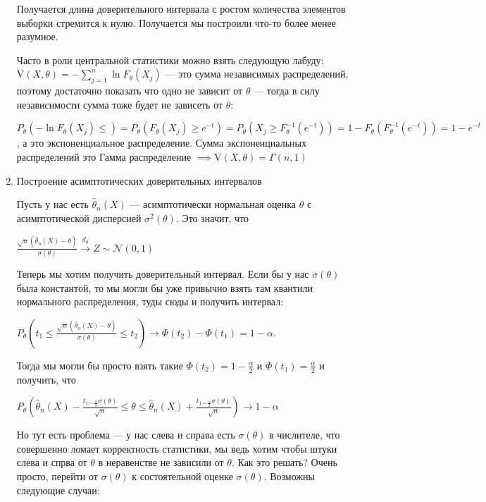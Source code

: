 \begin{enumerate}
\begin{example}
        Получается длина доверительного интервала с ростом количества элементов выборки стремится к нулю.
        Получается мы построили что-то более менее разумное.

        Часто в роли центральной статистики можно взять следующую лабуду: 
        $\text{V}(X, \theta) = -\sum_{j = 1}^n \ln F_\theta(X_j)$ --- это сумма независимых распределений,
        поэтому достаточно показать что одно не зависит от $\theta$ --- тогда в силу независимости сумма тоже
        будет не зависеть от $\theta$:

        $P_\theta(-\ln F_\theta(X_j) \leq) = P_\theta(F_\theta(X_j) \geq e^{-t}) =
        P_\theta(X_j \geq F_\theta^{-1}(e^{-t})) = 1 - F_\theta(F_\theta^{-1}(e^{-t})) = 1 - e^{-t}$, а это
        экспоненциальное распределение. Сумма экспоненциальных распределений это Гамма распределение
        $\implies \text{V}(X, \theta) = \Gamma(n, 1)$
    \end{example}

    \item Построение асимптотических доверительных интервалов
    
    Пусть у нас есть $\hat{\theta}_n(X)$ --- асимптотически нормальная оценка $\theta$ с
    асимптотической дисперсией $\sigma^2(\theta)$. Это значит, что

    $\frac{\sqrt{n}(\hat{\theta}_n(X) - \theta)}{\sigma(\theta)} \xrightarrow{d_\theta} Z \sim \mathcal{N}(0, 1)$

    Теперь мы хотим получить доверительный интервал. Если бы у нас $\sigma(\theta)$ была константой,
    то мы могли бы уже привычно взять там квантили нормального распределения, туды сюды и получить
    интервал: 
    
    $P_\theta(t_1 \leq \frac{\sqrt{n}(\hat{\theta}_n(X) - \theta)}{\sigma(\theta)} \leq t_2)
    \to \Phi(t_2) - \Phi(t_1) = 1 - \alpha$. 
    
    Тогда мы могли бы просто взять такие $\Phi(t_2) = 1 - \frac{\alpha}{2}$
    и $\Phi(t_1) = \frac{\alpha}{2}$ и получить, что 
    
    $P_\theta(\hat{\theta}_n(X) - \frac{t_{1 - \frac{\alpha}{2}}\sigma(\theta)}{\sqrt{n}}
    \leq \theta \leq \hat{\theta}_n(X) + \frac{t_{1 - \frac{\alpha}{2}}\sigma(\theta)}{\sqrt{n}}) 
    \to 1 - \alpha$

    Но тут есть проблема --- у нас слева и справа есть $\sigma(\theta)$ в числителе,
    что совершенно ломает корректность статистики, мы ведь хотим чтобы штуки слева и спрва от $\theta$
    в неравенстве не зависили от $\theta$. Как это решать? Очень просто, перейти от $\sigma(\theta)$ 
    к состоятельной оценке $\sigma(\theta)$. Возможны следующие случаи:


\end{enumerate}
